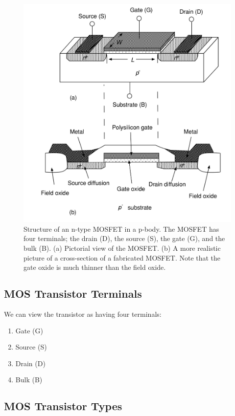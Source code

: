 \documentclass[main]{subfiles}
\begin{document}
\begin{figure}[H]
  \centering
  \includegraphics[scale=0.8]{figs/MOSFET_Structure.jpg}
  \caption{Structure of an n-type MOSFET in a p-body. The MOSFET has four terminals; the drain (D), the source (S), the gate (G), and the bulk (B). (a) Pictorial view of the MOSFET. (b) A more realistic picture of a cross-section of a fabricated MOSFET. Note that the gate oxide is much thinner than the field oxide. \cite{book:VLSI}}
  \label{fig:MOSFET_Structure}
\end{figure}\bigskip

\bigskip\subsection{MOS Transistor Terminals}
We can view the transistor as having four terminals:
\begin{enumerate}
\item Gate (G)
\item Source (S)
\item Drain (D)
\item Bulk (B)
\end{enumerate}

\bigskip\subsection{MOS Transistor Types}
\end{document}
